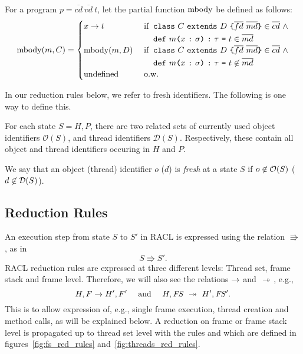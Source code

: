 \begin{definition}
  For a program $p = \overline{cd}~\overline{vd}~t$, let the partial function
  $\mbox{$\mathrm{mbody}$}$ be defined as follows:
  \begin{equation*}
    \mbox{$\mathrm{mbody}$}(m, C) = \begin{cases}
      x \to t & \text{ if } \: \begin{aligned}[t]
        &\mbox{\mdseries\texttt{class}~$C$~\texttt{extends}~$D$~\texttt{\{}$\overline{fd}$~$\overline{md}$\texttt{\}}} \in \overline{cd}~\land \\
        &\mbox{\mdseries\texttt{def}~$m$\texttt{(}$x$~\texttt{:}~$\sigma$\texttt{)}~\texttt{:}~$\tau$~\texttt{=}~$t$} \in \overline{md}
      \end{aligned} \\
      \mbox{$\mathrm{mbody}$}(m, D) & \text{ if } \: \begin{aligned}[t]
        &\mbox{\mdseries\texttt{class}~$C$~\texttt{extends}~$D$~\texttt{\{}$\overline{fd}$~$\overline{md}$\texttt{\}}} \in \overline{cd}~\land \\
        &\mbox{\mdseries\texttt{def}~$m$\texttt{(}$x$~\texttt{:}~$\sigma$\texttt{)}~\texttt{:}~$\tau$~\texttt{=}~$t$} \not\in \overline{md}
      \end{aligned} \\
      \text{undefined} & \text{ o.w.}
    \end{cases}
  \end{equation*}
\end{definition}
In our reduction rules below, we refer to fresh identifiers. The following is
one way to define this. 
\begin{definition}
  For each state $S = H, P$, there are two related sets of currently used object
  identifiers $\mathcal{O}(S)$, and thread identifiers $\mathcal{D}(S)$.
  Respectively, these contain all object and thread identifiers occuring in $H$
  and $P$. 
  
  We say that an object (thread) identifier $o$ ($d$) is \emph{fresh} at a state $S$ if
  $o \not\in \mathcal{O}(S)$ ($d \not\in \mathcal{D}(S)$).
\end{definition}


\subsection{Reduction Rules}%
\label{sub:reduction_rules}

An execution step from state $S$ to $S'$ in RACL is expressed using the relation
$\Rrightarrow$, as in
\begin{equation*}
  S \Rrightarrow S'.
\end{equation*}
RACL reduction rules are expressed at three different levels:
Thread set, frame stack and frame level. 
Therefore, we will also see the relations $\mbox{$\rightarrow$}$ and $\mbox{~$\twoheadrightarrow$~}$, e.g.,
\begin{equation*}
  H, F\; \mbox{$\rightarrow$}\; H', F' \quad \text{ and } \quad H, \mathit{FS} \;\mbox{~$\twoheadrightarrow$~}\; H', \mathit{FS}'.
\end{equation*}
This is to allow expression of, e.g., single frame execution,
thread creation and method calls, as will be explained below. 
A reduction on frame or frame stack level is propagated up to thread set level
with the rules \EFProp{} and \EFSProp{} which are defined in
figures~\ref{fig:fs_red_rules} and~\ref{fig:threads_red_rules}.

